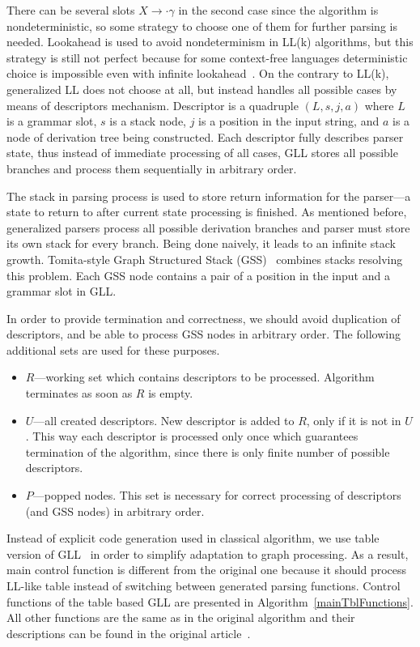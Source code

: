 There can be several slots $X \rightarrow \cdot \gamma$ in the second case since the algorithm is nondeterministic, so some strategy to choose one of them for further parsing is needed.
Lookahead is used to avoid nondeterminism in LL(k) algorithms, but this strategy is still not perfect because for some context-free languages deterministic choice is impossible even with infinite lookahead~\cite{LLnonLL}.
On the contrary to LL(k), generalized LL does not choose at all, but instead handles all possible cases by means of descriptors mechanism.
Descriptor is a quadruple $(L, s, j, a)$ where $L$ is a grammar slot, $s$ is a stack node, $j$ is a position in the input string, and $a$ is a node of derivation tree being constructed.
Each descriptor fully describes parser state, thus instead of immediate processing of all cases, GLL stores all possible branches and process them sequentially in arbitrary order.

The stack in parsing process is used to store return information for the parser---a state to return to after current state processing is finished.
As mentioned before, generalized parsers process all possible derivation branches and parser must store its own stack for every branch. 
Being done naively, it leads to an infinite stack growth.
Tomita-style Graph Structured Stack (GSS)~\cite{Tomita} combines stacks resolving this problem.
Each GSS node contains a pair of a position in the input and a grammar slot in GLL. 

In order to provide termination and correctness, we should avoid duplication of descriptors, and be able to process GSS nodes in arbitrary order. The following additional sets are used for these purposes.
\begin{itemize}
\item $R$---working set which contains descriptors to be processed. Algorithm terminates as soon as $R$ is empty.
\item $U$---all created descriptors. New descriptor is added to $R$, only if it is not in $U$.
This way each descriptor is processed only once which guarantees termination of the algorithm, since there is only finite number of possible descriptors.
\item $P$---popped nodes. This set is necessary for correct processing of descriptors (and GSS nodes) in arbitrary order.
\end{itemize}

Instead of explicit code generation used in classical algorithm, we use table version of GLL~\cite{TableGLL} in order to simplify adaptation to graph processing.
As a result, main control function is different from the original one because it should process LL-like table instead of switching between generated parsing functions.
Control functions of the table based GLL are presented in Algorithm~\ref{mainTblFunctions}.
All other functions are the same as in the original algorithm and their descriptions can be found in the original article~\cite{scott2010gll}.

